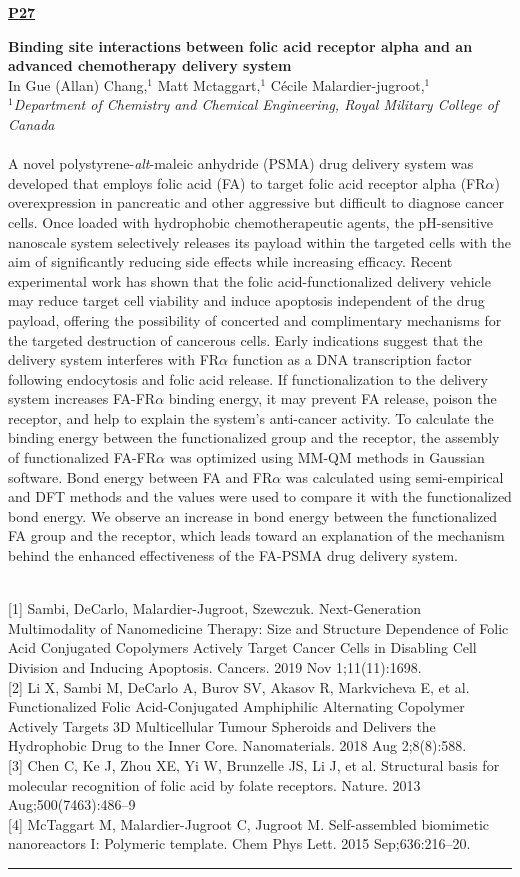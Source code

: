 \documentclass[titlepage,oneside,openany,10pt]{book}
\newenvironment{posterabswref}[5] %
        {
        \newcommand{\posterref}{#5}
	\begin{flushright}
                \underline{\textbf{#4}}
        \end{flushright}
        \textbf{#1}\\%
        #2\\%
        \textit{#3}\\\\%
        }
        {
        \vspace{0.5cm}
        \\\noindent \posterref \\ \noindent\rule{15cm}{0.5pt}%
        }
\begin{document}
\begin{posterabswref}
	{Binding site interactions between folic acid receptor alpha and an advanced chemotherapy delivery system}
	{In Gue (Allan) Chang,$^{1}$ Matt Mctaggart,$^{1}$ C\'{e}cile Malardier-jugroot,$^{1}$}
	{
	$^1$Department of Chemistry and Chemical Engineering, Royal Military College of Canada
	}
	{P27}
	{
	{[1]} Sambi, DeCarlo, Malardier-Jugroot, Szewczuk. Next-Generation Multimodality of Nanomedicine Therapy: Size and Structure Dependence of Folic Acid Conjugated Copolymers Actively Target Cancer Cells in Disabling Cell Division and Inducing Apoptosis. Cancers. 2019 Nov 1;11(11):1698.\\
	{[2]} Li X, Sambi M, DeCarlo A, Burov SV, Akasov R, Markvicheva E, et al. Functionalized Folic Acid-Conjugated Amphiphilic Alternating Copolymer Actively Targets 3D Multicellular Tumour Spheroids and Delivers the Hydrophobic Drug to the Inner Core. Nanomaterials. 2018 Aug 2;8(8):588.\\
	{[3]} Chen C, Ke J, Zhou XE, Yi W, Brunzelle JS, Li J, et al. Structural basis for molecular recognition of folic acid by folate receptors. Nature. 2013 Aug;500(7463):486--9\\
	{[4]} McTaggart M, Malardier-Jugroot C, Jugroot M. Self-assembled biomimetic nanoreactors I: Polymeric template. Chem Phys Lett. 2015 Sep;636:216--20.
	}
	A novel polystyrene-\emph{alt}-maleic anhydride (PSMA) drug delivery system was developed that employs folic acid (FA) to target folic acid receptor alpha (FR{\emph{$\alpha$}}) overexpression in pancreatic and other aggressive but difficult to diagnose cancer cells. Once loaded with hydrophobic chemotherapeutic agents, the pH-sensitive nanoscale system selectively releases its payload within the targeted cells with the aim of significantly reducing side effects while increasing efficacy. Recent experimental work has shown that the folic acid-functionalized delivery vehicle may reduce target cell viability and induce apoptosis independent of the drug payload, offering the possibility of concerted and complimentary mechanisms for the targeted destruction of cancerous cells. Early indications suggest that the delivery system interferes with FR{\emph{$\alpha$}} function as a DNA transcription factor following endocytosis and folic acid release. If functionalization to the delivery system increases FA-FR{\emph{$\alpha$}} binding energy, it may prevent FA release, poison the receptor, and help to explain the system's anti-cancer activity. To calculate the binding energy between the functionalized group and the receptor, the assembly of functionalized FA-FR{\emph{$\alpha$}} was optimized using MM-QM methods in Gaussian software. Bond energy between FA and FR{\emph{$\alpha$}} was calculated using semi-empirical and DFT methods and the values were used to compare it with the functionalized bond energy. We observe an increase in bond energy between the functionalized FA group and the receptor, which leads toward an explanation of the mechanism behind the enhanced effectiveness of the FA-PSMA drug delivery system.
	\label{ChangI}
\end{posterabswref}
\end{document}
